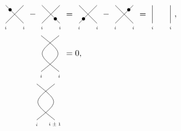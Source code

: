 \documentclass[11pt,reqno]{amsart}
\begin{document}
\begin{align*}
    {}\raisebox{-0.5em}{$\hackcenter{\begin{tikzpicture}[scale=0.375]
    \draw (0,0)--(2,2);
    \draw (2,0)--(0,2);
    \node at (0,-0.5) {\tiny $i$};
    \node at (2,-0.5) {\tiny $i$};
    \fill (0.5,1.5) circle (5pt);
\end{tikzpicture}}$}
-
\raisebox{-0.5em}{$\hackcenter{\begin{tikzpicture}[scale=0.375]
    \draw (0,0)--(2,2);
    \draw (2,0)--(0,2);
    \node at (0,-0.5) {\tiny $i$};
    \node at (2,-0.5) {\tiny $i$};
    \fill (1.5,0.5) circle (5pt);
\end{tikzpicture}}$}
&=
\raisebox{-0.5em}{$\hackcenter{\begin{tikzpicture}[scale=0.375]
    \draw (0,0)--(2,2);
    \draw (2,0)--(0,2);
    \node at (0,-0.5) {\tiny $i$};
    \node at (2,-0.5) {\tiny $i$};
    \fill (0.5,0.5) circle (5pt);
\end{tikzpicture}}$}
-
\raisebox{-0.5em}{$\hackcenter{\begin{tikzpicture}[scale=0.375]
    \draw (0,0)--(2,2);
    \draw (2,0)--(0,2);
    \node at (0,-0.5) {\tiny $i$};
    \node at (2,-0.5) {\tiny $i$};
    \fill (1.5,1.5) circle (5pt);
\end{tikzpicture}}$}
=
\raisebox{-0.5em}{$\hackcenter{\begin{tikzpicture}[scale=0.375]
    \draw (0,0)--(0,2);
    \draw (2,0)--(2,2);
    \node at (0,-0.5) {\tiny $i$};
    \node at (2,-0.5) {\tiny $i$};
\end{tikzpicture}}$},\\ 
{}\raisebox{-0.5em}{$\hackcenter{\begin{tikzpicture}[scale=0.375]
    \draw (0,0)..controls(2.5,2)..(0,4);
    \draw (2,0)..controls(-0.5,2)..(2,4);
    \node at (0,-0.5) {\tiny $i$};
    \node at (2,-0.5) {\tiny $i$};
\end{tikzpicture}}$}
&=0,\\ 
{}\raisebox{-0.5em}{$\hackcenter{\begin{tikzpicture}[scale=0.375]
    \draw (0,0)..controls(2.5,2)..(0,4);
    \draw (2,0)..controls(-0.5,2)..(2,4);
    \node at (0,-0.5) {\tiny $i$};
    \node at (2,-0.5) {\tiny $i\pm 1$};
\end{tikzpicture}}$}

\end{align*}
\end{document}
